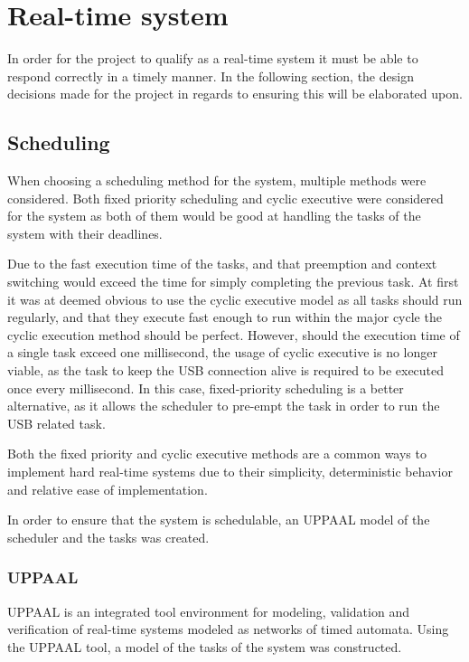 \section{Real-time system}\label{Design:RTS} 
In order for the project to qualify as a real-time system it must be able to respond correctly in a timely manner.
In the following section, the design decisions made for the project in regards to ensuring this will be elaborated upon. 

\subsection{Scheduling}\label{Design:Scheduling}
When choosing a scheduling method for the system, multiple methods were considered. 
Both fixed priority scheduling and cyclic executive were considered for the system as both of them would be good at handling the tasks of the system with their deadlines.

Due to the fast execution time of the tasks, and that preemption and context switching would exceed the time for simply completing the previous task.
At first it was at deemed obvious to use the cyclic executive model as all tasks should run regularly, and that they execute fast enough to run within the major cycle the cyclic execution method should be perfect. 
However, should the execution time of a single task exceed one millisecond, the usage of cyclic executive is no longer viable, as the task to keep the USB connection alive is required to be executed once every millisecond.
In this case, fixed-priority scheduling is a better alternative, as it allows the scheduler to pre-empt the task in order to run the USB related task.

Both the fixed priority and cyclic executive methods are a common ways to implement hard real-time systems due to their simplicity, deterministic behavior and relative ease of implementation\cite{CyclicExecutionKimLarsen}.

In order to ensure that the system is schedulable, an UPPAAL model of the scheduler and the tasks was created. 

\subsubsection{UPPAAL}
UPPAAL is an integrated tool environment for modeling, validation and verification of real-time systems modeled as networks of timed automata\cite{UPPAALWebsite}. 
Using the UPPAAL tool, a model of the tasks of the system was constructed. 

